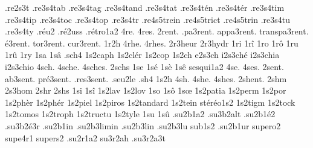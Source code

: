 {                    .re2s3t
                    .re3s4tab
                    .re3s4tag
                    .re3s4tand
                    .re3s4tat
                    .re3s4tén
                    .re3s4tér
                    .re3s4tim
                    .re3s4tip
                    .re3s4toc
                    .re3s4top
                    .re3s4tr
                    .re4s5trein
                    .re4s5trict
                    .re4s5trin
                    .re3s4tu
                    .re3s4ty
                    .réu2 %
                    .ré2uss
                    .rétro1a2
4re.
4res.
       2rent. %
    .pa3rent.
   appa3rent.
transpa3rent.
    é3rent.
    tor3rent.
    cur3rent.
%
1r2h
4rhe.
4rhes.
                    2r3heur
                    2r3hydr
1ri
1rî
1ro
1rô
1ru
1rû
1ry
1sa
1sâ
.sch4
                    1s2caph
                    1s2clér
                    1s2cop
 1s2ch
e2s3ch
i2s3ché
i2s3chia
i2s3chio
4sch.
4sche.
4sches.
2schs
1se
1sé
1sè
1sê
                    sesqui1a2
4se.
4ses.
    2sent. %
  ab3sent.
 pré3sent.
.res3sent.
%
.seu2le %
.sh4
1s2h
4sh.
4she.
4shes.
2shent. %
2shm
                    2s3hom
2shr
2shs
1si
1sî
                    1s2lav
                    1s2lov
1so
1sô
1sœ
                    1s2patia
                    1s2perm
                    1s2por
                    1s2phèr
                    1s2phér
                    1s2piel
                    1s2piros
                    1s2tandard
                    1s2tein
                    stéréo1s2
                    1s2tigm
                    1s2tock
                    1s2tomos
                    1s2troph
                    1s2tructu
                    1s2tyle
1su
1sû
                    .su2b1a2
                    .su3b2alt
                    .su2b1é2
                    .su3b2é3r
                    .su2b1in
                    .su2b3limin
                    .su2b3lin
                    .su2b3lu
                    sub1s2
                    .su2b1ur
                    supero2
                    supe4r1
                    supers2
                    .su2r1a2
                    su3r2ah
                    .su3r2a3t
}
